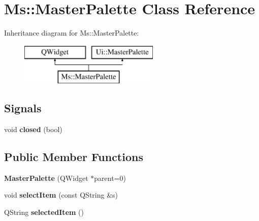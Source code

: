 \hypertarget{class_ms_1_1_master_palette}{}\section{Ms\+:\+:Master\+Palette Class Reference}
\label{class_ms_1_1_master_palette}
Inheritance diagram for Ms\+:\+:Master\+Palette\+:\begin{figure}[H]
\begin{center}
\leavevmode
\includegraphics[height=2.000000cm]{class_ms_1_1_master_palette}
\end{center}
\end{figure}
\subsection*{Signals}
\begin{DoxyCompactItemize}
\item 
\mbox{\label{class_ms_1_1_master_palette_ab63de28dbad82b19c4bdd2d3f7e5a5e7}} 
void {\bfseries closed} (bool)
\end{DoxyCompactItemize}
\subsection*{Public Member Functions}
\begin{DoxyCompactItemize}
\item 
\mbox{\label{class_ms_1_1_master_palette_a24f451176bf51937897cd9b0cb7c06ee}} 
{\bfseries Master\+Palette} (Q\+Widget $\ast$parent=0)
\item 
\mbox{\label{class_ms_1_1_master_palette_afbcff415fc7d1759f5f5bd925e9e6a6f}} 
void {\bfseries select\+Item} (const Q\+String \&s)
\item 
\mbox{\label{class_ms_1_1_master_palette_a6185d29f8791fbc256f941c18c109ca2}} 
Q\+String {\bfseries selected\+Item} ()
\end{DoxyCompactItemize}
